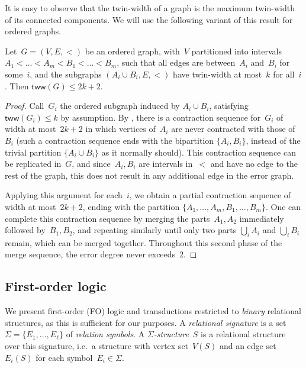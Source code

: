 \documentclass[a4paper,UKenglish,cleveref,thm-restate]{lipics-v2021}
\theoremstyle{remark}
\newcommand{\tww}{\mathsf{tww}}
\begin{document}
It is easy to observe that the twin-width of a graph is the maximum twin-width of its connected components.
We will use the following variant of this result for ordered graphs.
\begin{lemma}\label{lem:ordered-components}
    Let~$G = (V,E,<)$ be an ordered graph, with~$V$ partitioned into intervals $A_1 < \dots < A_m < B_1 < \dots < B_m$, such that
    all edges are between~$A_i$ and~$B_i$ for some~$i$, and the subgraphs $(A_i \cup B_i, E, <)$ have twin-width at most~$k$ for all~$i$.
    Then $\tww(G) \le 2k+2$.
\end{lemma}
\begin{proof}
    Call~$G_i$ the ordered subgraph induced by $A_i \cup B_i$, satisfying $\tww(G_i) \le k$ by assumption.
    By \cite[Theorem~4.1]{Bonnet2022twinwidth1}, there is a contraction sequence for~$G_i$ of width at most~$2k+2$
    in which vertices of~$A_i$ are never contracted with those of~$B_i$
    (such a contraction sequence ends with the bipartition $\{A_i,B_i\}$, instead of the trivial partition $\{A_i \cup B_i\}$ as it normally should).
    This contraction sequence can be replicated in~$G$,
    and since~$A_i,B_i$ are intervals in~$<$ and have no edge to the rest of the graph, this does not result in any additional edge in the error graph.

    Applying this argument for each~$i$, we obtain a partial contraction sequence of width at most~$2k+2$, ending with the partition $\{A_1,\dots,A_m,B_1,\dots,B_m\}$.
    One can complete this contraction sequence by merging the parts~$A_1,A_2$ immediately followed by~$B_1,B_2$, and repeating similarly until only two parts $\bigcup_i A_i$ and $\bigcup_i B_i$ remain, which can be merged together.
    Throughout this second phase of the merge sequence, the error degree never exceeds~2.
\end{proof}


\subsection{First-order logic}\label{sec:prelim:FO}
We present first-order (FO) logic and transductions restricted to \emph{binary} relational structures, as this is sufficient for our purposes.
A \emph{relational signature} is a set $\Sigma = \{E_1,\dots,E_\ell\}$ of \emph{relation symbols}.
A \emph{$\Sigma$-structure}~$S$ is a relational structure over this signature,
i.e.\ a structure with vertex set~$V(S)$ and an edge set~$E_i(S)$ for each symbol~$E_i \in \Sigma$.
\end{document}
